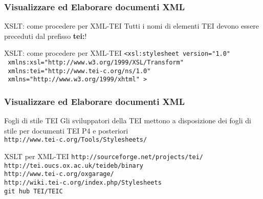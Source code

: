 \begin{frame}
    \frametitle{Visualizzare ed Elaborare documenti XML}
    \addtocounter{nframe}{1}
    

     \begin{block}{XSLT: come procedere per XML-TEI}
        Tutti i nomi di elementi TEI devono essere preceduti dal prefisso \textbf{tei:}!
     \end{block}

     \begin{block}{XSLT: come procedere per XML-TEI}
        \texttt{<xsl:stylesheet version="1.0"}
        \\\texttt{ xmlns:xsl="http://www.w3.org/1999/XSL/Transform"}
        \\\texttt{ xmlns:tei="http://www.tei-c.org/ns/1.0"}
        \\\texttt{ xmlns="http://www.w3.org/1999/xhtml" >}
     \end{block}
    
\end{frame}

   

\begin{frame}
    \frametitle{Visualizzare ed Elaborare documenti XML}
    \addtocounter{nframe}{1}
    

     \begin{block}{Fogli di stile TEI}
        Gli sviluppatori della TEI mettono a disposizione dei fogli di stile per documenti TEI P4 e posteriori
        \\\texttt{http://www.tei-c.org/Tools/Stylesheets/}
     \end{block}

     \begin{block}{XSLT per XML-TEI}
        \texttt{http://sourceforge.net/projects/tei/}
        \\\texttt{http://tei.oucs.ox.ac.uk/teideb/binary}
        \\\texttt{http://www.tei-c.org/oxgarage/}
        \\\texttt{http://wiki.tei-c.org/index.php/Stylesheets}
        \\\texttt{git hub TEI/TEIC}
     \end{block}
    
\end{frame}


